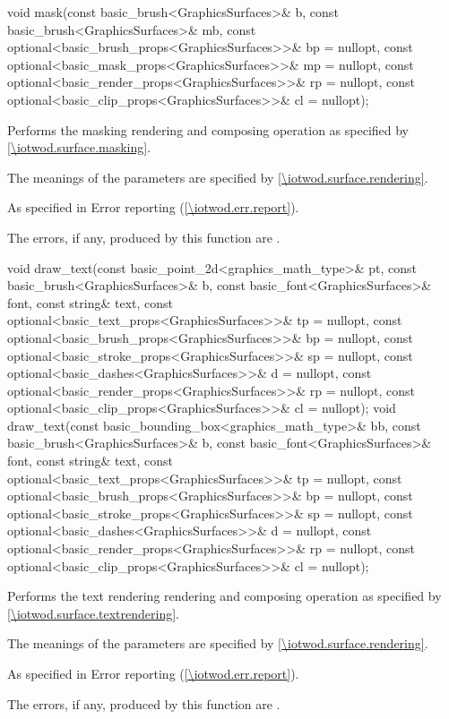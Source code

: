 %
\begin{itemdecl}
void mask(const basic_brush<GraphicsSurfaces>& b,
  const basic_brush<GraphicsSurfaces>& mb,
  const optional<basic_brush_props<GraphicsSurfaces>>& bp = nullopt,
  const optional<basic_mask_props<GraphicsSurfaces>>& mp = nullopt,
  const optional<basic_render_props<GraphicsSurfaces>>& rp = nullopt,
  const optional<basic_clip_props<GraphicsSurfaces>>& cl = nullopt);
\end{itemdecl}
\begin{itemdescr}
\pnum
\effects
Performs the masking rendering and composing operation as specified by \ref{\iotwod.surface.masking}.

\pnum
The meanings of the parameters are specified by \ref{\iotwod.surface.rendering}.

\pnum
\throws
As specified in Error reporting (\ref{\iotwod.err.report}).

\pnum
\errors

The errors, if any, produced by this function are .
\end{itemdescr}

%
\begin{itemdecl}
void draw_text(const basic_point_2d<graphics_math_type>& pt,
  const basic_brush<GraphicsSurfaces>& b,
  const basic_font<GraphicsSurfaces>& font, const string& text,
  const optional<basic_text_props<GraphicsSurfaces>>& tp = nullopt,
  const optional<basic_brush_props<GraphicsSurfaces>>& bp = nullopt,
  const optional<basic_stroke_props<GraphicsSurfaces>>& sp = nullopt,
  const optional<basic_dashes<GraphicsSurfaces>>& d = nullopt,
  const optional<basic_render_props<GraphicsSurfaces>>& rp = nullopt,
  const optional<basic_clip_props<GraphicsSurfaces>>& cl = nullopt);
void draw_text(const basic_bounding_box<graphics_math_type>& bb,
  const basic_brush<GraphicsSurfaces>& b,
  const basic_font<GraphicsSurfaces>& font, const string& text,
  const optional<basic_text_props<GraphicsSurfaces>>& tp = nullopt,
  const optional<basic_brush_props<GraphicsSurfaces>>& bp = nullopt,
  const optional<basic_stroke_props<GraphicsSurfaces>>& sp = nullopt,
  const optional<basic_dashes<GraphicsSurfaces>>& d = nullopt,
  const optional<basic_render_props<GraphicsSurfaces>>& rp = nullopt,
  const optional<basic_clip_props<GraphicsSurfaces>>& cl = nullopt);
\end{itemdecl}
\begin{itemdescr}
\pnum
\effects
Performs the text rendering rendering and composing operation as specified by \ref{\iotwod.surface.textrendering}.

\pnum
The meanings of the parameters are specified by \ref{\iotwod.surface.rendering}.

\pnum
\throws
As specified in Error reporting (\ref{\iotwod.err.report}).

\pnum
\errors

The errors, if any, produced by this function are .
\end{itemdescr}

